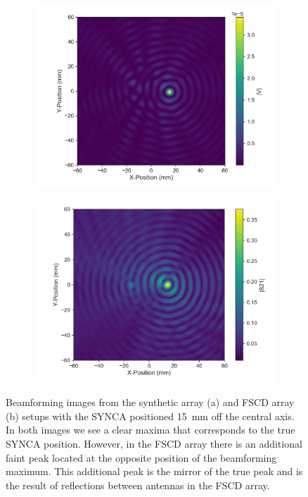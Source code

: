 \begin{figure}[htbp]
    \centering
    \begin{subfigure}[b]{0.48\textwidth}
        \includegraphics[width=1\textwidth]{figs/Chapter-5/230414_z00r15_synth_beamform.png}
        \caption{}
        \label{fig:synth-jugaad-bf-image}
    \end{subfigure}
    \hfill
    \begin{subfigure}[b]{0.48\textwidth}
        \includegraphics[width=1\textwidth]{figs/Chapter-5/230414_z00r15_jugaad_beamform_mean.png}
        \caption{}
        \label{fig:jugaad-bf-image}
    \end{subfigure}
    \hfill
    \caption{Beamforming images from the synthetic array (a) and FSCD array (b) setups with the SYNCA positioned 15~mm off the central axis. In both images we see a clear maxima that corresponds to the true SYNCA position. However, in the FSCD array there is an additional faint peak located at the opposite position of the beamforming maximum. This additional peak is the mirror of the true peak and is the result of reflections between antennas in the FSCD array.}
    \label{fig:measured-bf-images}
\end{figure}

